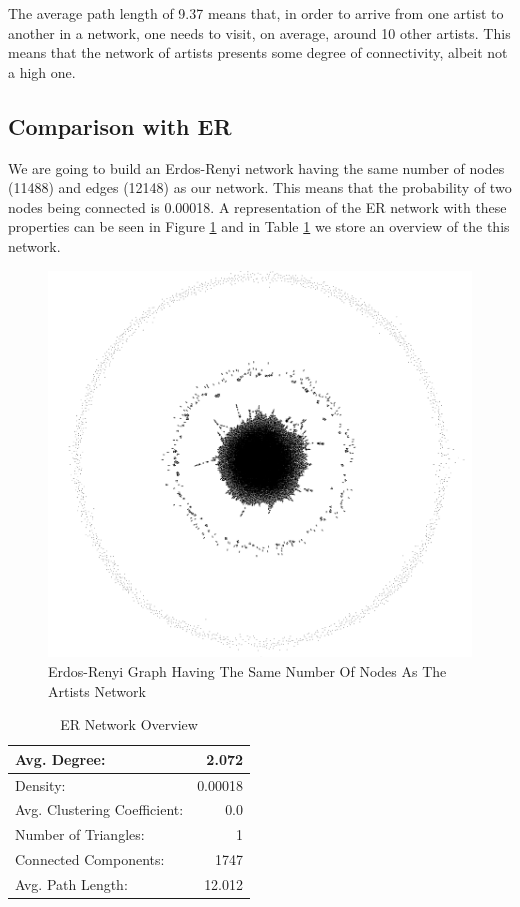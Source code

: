 \documentclass[sigchi]{acmart}
\begin{document}
The average path length of 9.37 means that, in order to arrive from one artist to another in a network, one needs to visit, on average, around 10 other artists. This means that the network of artists presents some degree of connectivity, albeit not a high one.

\subsection{Comparison with ER}

We are going to build an Erdos-Renyi network having the same number of nodes (11488) and edges (12148) as our network. This means that the probability of two nodes being connected is 0.00018. A representation of the ER network with these properties can be seen in Figure \ref{fig:ER-graph} and in Table \ref{tab:ER-metrics} we store an overview of the this network.

\begin{figure}[h!]
  \centering
  \includegraphics[width=\linewidth]{img/ER_graph.png}
  \caption{Erdos-Renyi Graph Having The Same Number Of Nodes As The Artists Network}
  \label{fig:ER-graph}
\end{figure}

\begin{table}[h!]
  \caption{ER Network Overview}
  \label{tab:ER-metrics}
  \begin{tabular}{| l | r |}
    \hline
    Avg. Degree: & 2.072 \\
    \hline
    Density: & 0.00018 \\
    \hline
    Avg. Clustering Coefficient: & 0.0 \\
    \hline
    Number of Triangles: & 1 \\
    \hline
    Connected Components: & 1747 \\
    \hline
    Avg. Path Length: & 12.012 \\
    \hline
    
\end{tabular}
\end{table}
\end{document}
